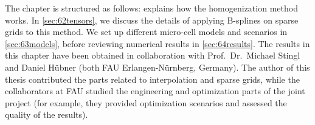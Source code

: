 The chapter is structured as follows:
 explains how the homogenization method works.
In \cref{sec:62tensors}, we discuss the details of applying B-splines on
sparse grids to this method.
We set up different micro-cell models and scenarios in \cref{sec:63models},
before reviewing numerical results in \cref{sec:64results}.
The results in this chapter have been obtained in collaboration with
Prof.\ Dr.\ Michael Stingl and Daniel Hübner
(both FAU Erlangen-Nürnberg, Germany).
The author of this thesis contributed the parts related to
interpolation and sparse grids, while the collaborators at FAU
studied the engineering and optimization parts of the joint project
(for example, they provided optimization scenarios and
assessed the quality of the results).






\cleardoublepage
